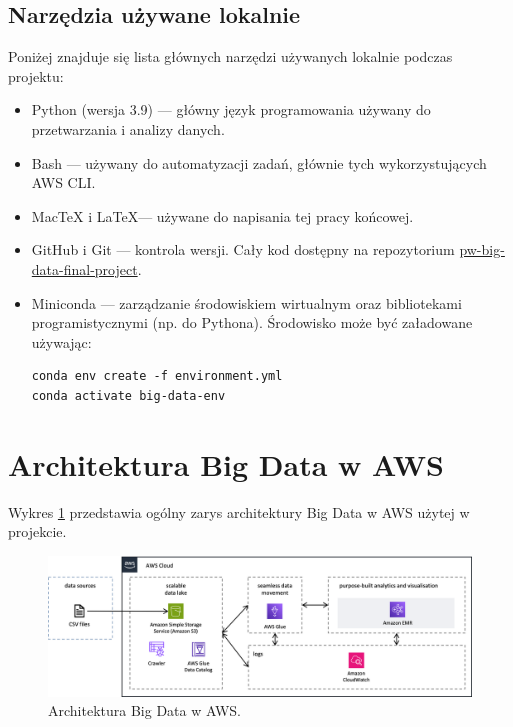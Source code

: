 \documentclass[12pt, a4paper]{article}
\begin{document}
\subsection{Narzędzia używane lokalnie}
Poniżej znajduje się lista głównych narzędzi używanych lokalnie podczas projektu:
\begin{itemize}
    \item Python (wersja 3.9) --- główny język programowania używany do przetwarzania i analizy danych.
    \item Bash --- używany do automatyzacji zadań, głównie tych wykorzystujących AWS CLI.
    \item MacTeX i \LaTeX --- używane do napisania tej pracy końcowej.
    \item GitHub i Git --- kontrola wersji. Cały kod dostępny na repozytorium \href{https://github.com/safurynp/pw-big-data-final-project}{pw-big-data-final-project}.
    \item Miniconda --- zarządzanie środowiskiem wirtualnym oraz bibliotekami programistycznymi (np. do Pythona). Środowisko może być załadowane używając:
\begin{verbatim}
conda env create -f environment.yml
conda activate big-data-env
\end{verbatim}

\end{itemize}

\section{Architektura Big Data w AWS} \label{sec:aws_architecture}
Wykres \ref{fig:aws_architecture} przedstawia ogólny zarys architektury Big Data w AWS użytej w projekcie.
\begin{figure}[h]
    \includegraphics[width=\textwidth]{figures/aws_architecture.png}
    \caption{Architektura Big Data w AWS.}
    \label{fig:aws_architecture}
\end{figure}
\end{document}
